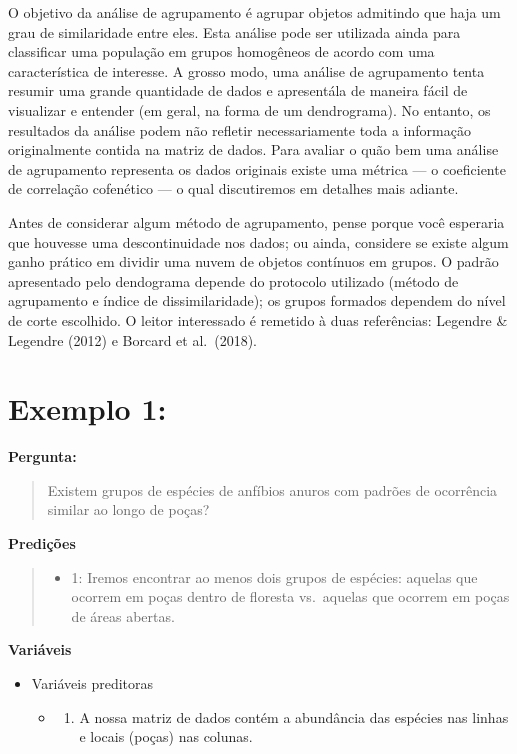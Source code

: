 \documentclass[
]{book}
\providecommand{\tightlist}{%
  \setlength{\itemsep}{0pt}\setlength{\parskip}{0pt}}
\begin{document}
O objetivo da análise de agrupamento é agrupar objetos admitindo que haja um grau de similaridade entre eles. Esta análise pode ser utilizada ainda para classificar uma população em grupos homogêneos de acordo com uma característica de interesse. A grosso modo, uma análise de agrupamento tenta resumir uma grande quantidade de dados e apresentála de maneira fácil de visualizar e entender (em geral, na forma de um dendrograma). No entanto, os resultados da análise podem não refletir necessariamente toda a informação originalmente contida na matriz de dados. Para avaliar o quão bem uma análise de agrupamento representa os dados originais existe uma métrica --- o coeficiente de correlação cofenético --- o qual discutiremos em detalhes mais adiante.

Antes de considerar algum método de agrupamento, pense porque você esperaria que houvesse uma descontinuidade nos dados; ou ainda, considere se existe algum ganho prático em dividir uma nuvem de objetos contínuos em grupos. O padrão apresentado pelo dendograma depende do protocolo utilizado (método de agrupamento e índice de dissimilaridade); os grupos formados dependem do nível de corte escolhido. O leitor interessado é remetido à duas referências: Legendre \& Legendre (2012) e Borcard et al.~(2018).

\hypertarget{exemplo-1}{%
\section{Exemplo 1:}\label{exemplo-1}}

\textbf{Pergunta:}

\begin{quote}
Existem grupos de espécies de anfíbios anuros com padrões de ocorrência similar ao longo de poças?
\end{quote}

\textbf{Predições}

\begin{quote}
\begin{itemize}
\tightlist
\item
  1: Iremos encontrar ao menos dois grupos de espécies: aquelas que ocorrem em poças dentro de floresta vs.~aquelas que ocorrem em poças de áreas abertas.
\end{itemize}
\end{quote}

\textbf{Variáveis}

\begin{itemize}
\tightlist
\item
  Variáveis preditoras

  \begin{itemize}
  \item
    \begin{enumerate}
    \def\labelenumi{\arabic{enumi}.}
    \tightlist
    \item
      A nossa matriz de dados contém a abundância das espécies nas linhas e locais (poças) nas colunas.
    \end{enumerate}
  \end{itemize}
\end{itemize}
\end{document}
